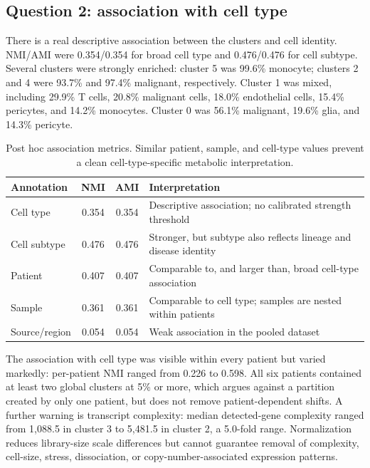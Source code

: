 \documentclass[11pt]{article}
\begin{document}
\subsection{Question 2: association with cell type}

There is a real descriptive association between the clusters and cell identity. NMI/AMI were 0.354/0.354 for broad cell type and 0.476/0.476 for cell subtype. Several clusters were strongly enriched: cluster 5 was 99.6\% monocyte; clusters 2 and 4 were 93.7\% and 97.4\% malignant, respectively. Cluster 1 was mixed, including 29.9\% T cells, 20.8\% malignant cells, 18.0\% endothelial cells, 15.4\% pericytes, and 14.2\% monocytes. Cluster 0 was 56.1\% malignant, 19.6\% glia, and 14.3\% pericyte.

\begin{table}[H]
\centering
\small
\begin{tabular}{lccp{}}
\toprule
Annotation & NMI & AMI & Interpretation \\
\midrule
Cell type & 0.354 & 0.354 & Descriptive association; no calibrated strength threshold \\
Cell subtype & 0.476 & 0.476 & Stronger, but subtype also reflects lineage and disease identity \\
Patient & 0.407 & 0.407 & Comparable to, and larger than, broad cell-type association \\
Sample & 0.361 & 0.361 & Comparable to cell type; samples are nested within patients \\
Source/region & 0.054 & 0.054 & Weak association in the pooled dataset \\
\bottomrule
\end{tabular}
\caption{Post hoc association metrics. Similar patient, sample, and cell-type values prevent a clean cell-type-specific metabolic interpretation.}
\end{table}

The association with cell type was visible within every patient but varied markedly: per-patient NMI ranged from 0.226 to 0.598. All six patients contained at least two global clusters at 5\% or more, which argues against a partition created by only one patient, but does not remove patient-dependent shifts. A further warning is transcript complexity: median detected-gene complexity ranged from 1,088.5 in cluster 3 to 5,481.5 in cluster 2, a 5.0-fold range. Normalization reduces library-size scale differences but cannot guarantee removal of complexity, cell-size, stress, dissociation, or copy-number-associated expression patterns.
\end{document}
